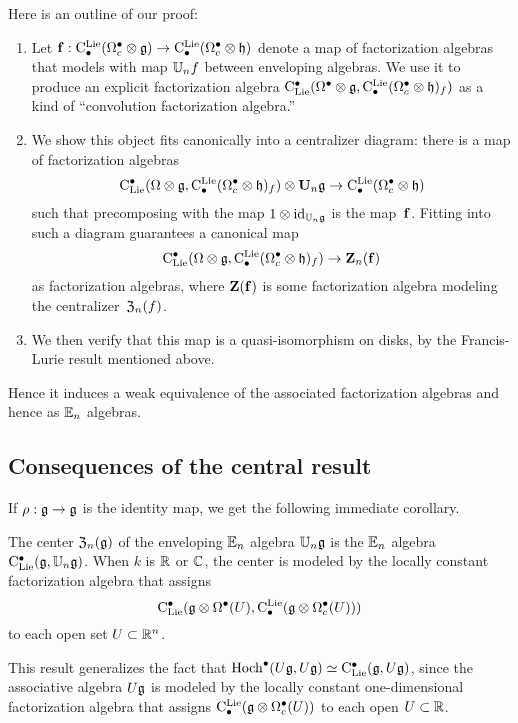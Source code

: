 \documentclass[11pt]{amsart}
\numberwithin{equation}{section}
\begin{document}
Here is an outline of our proof:
\begin{enumerate}
\item Let ${\bf f}: {\rm C}^{\rm Lie}_\bullet(\Omega_c^\bullet \otimes \mathfrak g) \to {\rm C}^{\rm Lie}_\bullet(\Omega_c^\bullet \otimes \mathfrak h)$ denote a map of factorization algebras that models with map $\mathbb U_n f$ between enveloping algebras. 
We use it to produce an explicit factorization algebra ${\rm C}_{\rm Lie}^\bullet(\Omega^\bullet \otimes \mathfrak g, {\rm C}^{\rm Lie}_\bullet(\Omega_c^\bullet \otimes \mathfrak h)_f)$ as a kind of ``convolution factorization algebra.'' 
\item We show this object fits canonically into a centralizer diagram: there is a map of factorization algebras
\[
{\rm C}_{\rm Lie}^\bullet(\Omega \otimes \mathfrak g, {\rm C}^{\rm Lie}_\bullet(\Omega_c^\bullet \otimes \mathfrak h)_f) \otimes \mathbf U_n \mathfrak g \to {\rm C}^{\rm Lie}_\bullet(\Omega_c^\bullet \otimes \mathfrak h)
\]
such that precomposing with the map $1 \otimes {\rm id}_{\mathbb U_n \mathfrak g}$ is the map~${\bf f}$.
Fitting into such a diagram guarantees a canonical map 
\[
{\rm C}_{\rm Lie}^\bullet(\Omega \otimes \mathfrak g, {\rm C}^{\rm Lie}_\bullet(\Omega_c^\bullet \otimes \mathfrak h)_f) \to \mathbf Z_n({\bf f})
\]
as factorization algebras, where $\mathbf Z({\bf f})$ is some factorization algebra modeling the centralizer~${\frak Z}_n(f)$. 
\item We then verify that this map is a quasi-isomorphism on disks, by the Francis-Lurie result mentioned above. 
\end{enumerate}
Hence it induces a weak equivalence of the associated factorization algebras and hence as $\mathbb E_n$ algebras. 

\subsection{Consequences of the central result}

If $\rho: \mathfrak g \to \mathfrak g$ is the identity map, we get the following immediate corollary.

\begin{cor}
\label{thm: center}
The center ${\frak Z}_n(\mathfrak g)$ of the enveloping $\mathbb E_n$ algebra $\mathbb U_n\mathfrak g$ is the $\mathbb E_n$ algebra ${\rm C}_{\rm Lie}^\bullet(\mathfrak g, \mathbb U_n\mathfrak g)$. 
When $k$ is $\mathbb R$ or $\mathbb C$, the 
center is modeled by the locally constant factorization algebra that assigns
\[
{\rm C}_{\rm Lie}^\bullet(\mathfrak g \otimes \Omega^\bullet(U), {\rm C}^{\rm Lie}_\bullet( \mathfrak g \otimes \Omega^\bullet_c(U)))
\]
to each open set $U \subset \mathbb R^n$.
\end{cor}

This result generalizes the fact that ${\rm Hoch}^\bullet(U\mathfrak g,U\mathfrak g) \simeq {\rm C}_{\rm Lie}^\bullet(\mathfrak g, U\mathfrak g)$, 
since the associative algebra $U\mathfrak g$ is modeled by the locally constant one-dimensional factorization algebra that assigns
${\rm C}^{\rm Lie}_\bullet (\mathfrak g \otimes \Omega^\bullet_c(U))$ to each open $U \subset \mathbb R$. 
\end{document}
